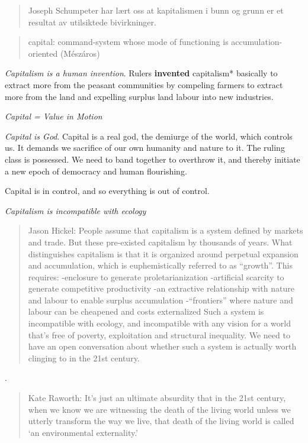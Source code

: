 \documentclass[
]{book}
\begin{document}
\begin{quote}
Joseph Schumpeter har lært oss at kapitalismen i bunn og grunn er et resultat av utilsiktede bivirkninger.
\end{quote}

\begin{quote}
capital: command-system whose mode of functioning is accumulation-oriented (Mészáros)
\end{quote}

\emph{Capitalism is a human invention}.
Rulers \textbf{invented} capitalism* basically to
extract more from the peasant communities by compeling farmers to extract more from the land
and expelling surplus land labour into new industries.

\emph{Capital = Value in Motion}

\emph{Capital is God}.
Capital is a real god, the demiurge of the world, which controls us. It demands we sacrifice of our own humanity and nature to it. The ruling class is possessed. We need to band together to overthrow it, and thereby initiate a new epoch of democracy and human flourishing.

Capital is in control, and so everything is out of control.

\emph{Capitalism is incompatible with ecology}

\begin{quote}
Jason Hickel: People assume that capitalism is a system
defined by markets and trade.
But these pre-existed capitalism by thousands of years.
What distinguishes capitalism is that it is organized around
perpetual expansion and accumulation,
which is euphemistically referred to as ``growth''.
This requires:
-enclosure to generate proletarianization
-artificial scarcity to generate competitive productivity
-an extractive relationship with nature and labour to enable surplus accumulation
-``frontiers'' where nature and labour can be cheapened and costs externalized
Such a system is incompatible with ecology, and incompatible with any vision
for a world that's free of poverty, exploitation and structural inequality.
We need to have an open conversation about whether such a system is actually
worth clinging to in the 21st century.
\end{quote}

.

\begin{quote}
Kate Raworth: It's just an ultimate absurdity that in the 21st century,
when we know we are witnessing the death of the living world
unless we utterly transform the way we live,
that death of the living world is called `an environmental externality.'
\end{quote}
\end{document}
